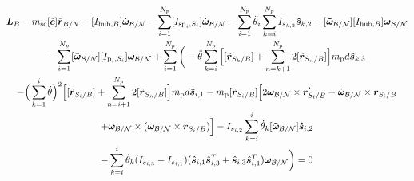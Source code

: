 \begin{multline}
	\bm L_B - m_{\text{sc}}[\tilde{\bm{c}}]\ddot{\bm r}_{B/N} -[I_{\text{hub},B}] \dot{\bm\omega}_{\cal B/N} - \sum\limits_{i=1}^{N_p}[I_{\text{sp}_i,S_i}] \dot{\bm\omega}_{\cal B/N} - \sum\limits_{i=1}^{N_p} \ddot{\theta}_i \sum^{N_p}_{k=i}I_{s_{k,2}} \bm{\hat{s}}_{k,2} -[\bm{\tilde{\omega}}_{\cal B/N}] [I_{\text{hub},B}] \bm\omega_{\cal B/N} \\
	- \sum\limits_{i=1}^{N_p}[\bm{\tilde{\omega}}_{\cal B/N}] [I_{\text{p}_i,S_i}] \bm\omega_{\cal B/N}
	+ \sum\limits_{i=1}^{N_p}\bigg( - \ddot{\theta}\sum\limits_{k=i}^{N_p}\Big[ [\tilde{{\bm r}}_{S_{k}/B}] + \sum\limits_{n=k+1}^{N_p}2[\tilde{{\bm r}}_{S_{n}/B}]\Big]m_{\text{p}} d \bm{\hat{s}}_{k,3} \\
	- \Big( \sum\limits_{k=1}^{i} \dot{\theta}\Big)^2 \Big[[\tilde{{\bm r}}_{S_{i}/B}] + \sum\limits_{n=i+1}^{N_p}2[\tilde{{\bm r}}_{S_{n}/B}]\Big] m_{\text{p}} d \bm{\hat{s}}_{i,1}
	- m_{\text{p}} [\tilde{{\bm r}}_{S_{i}/B}] \Big[ 
	2 \bm\omega_{\cal B/N} \times \bm{r}'_{S_i/B} +  \dot{\bm\omega}_{\cal B/N} \times \bm{r}_{S_i/B}
	\\
	+ \bm\omega_{\cal B/N} \times (\bm\omega_{\cal B/N} \times \bm{r}_{S_i/B})\Big]
	- I_{s_{i,2}} \sum^{i}_{k=i} \dot{\theta}_k [\bm{\tilde{\omega}}_{\cal B/N}] \bm{\hat{s}}_{i,2} \\
	-\sum^{i}_{k=i} \dot{\theta}_k (I_{s_{i,3}}-I_{s_{i,1}})(\hat{\bm s}_{i,1}\hat{\bm s}_{i,3}^{T}+\hat{\bm s}_{i,3}\hat{\bm s}_{i,1}^{T}) \bm\omega_{\cal B/N} \bigg) = 0
\end{multline}

